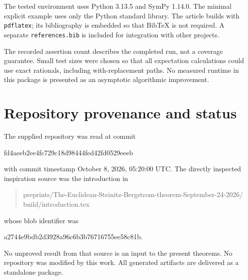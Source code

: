 \documentclass[11pt,letterpaper]{article}
\numberwithin{equation}{section}
\theoremstyle{definition}
\begin{document}
The tested environment uses Python 3.13.5 and SymPy 1.14.0. The minimal explicit example uses only the Python standard library. The article builds with \texttt{pdflatex}; its bibliography is embedded so that BibTeX is not required. A separate \texttt{references.bib} is included for integration with other projects.

The recorded assertion count describes the completed run, not a coverage guarantee. Small test sizes were chosen so that all expectation calculations could use exact rationals, including with-replacement paths. No measured runtime in this package is presented as an asymptotic algorithmic improvement.

\section{Repository provenance and status}
\label{app:provenance}

The supplied repository was read at commit
\begin{center}\small\ttfamily
fd4aeeb2ee4fc729c18d98444fed42fd0529eeeb
\end{center}
with commit timestamp October 8, 2026, 05:20:00 UTC. The directly inspected inspiration source was the introduction in
\begin{quote}\small\ttfamily
preprints/The-Euclidean-Steinitz-Bergstrom-theorem-September-24-2026/\\
build/introduction.tex
\end{quote}
whose blob identifier was
\begin{center}\small\ttfamily
a2744e9bdb2d3928a96c6b3b76716755ee58c81b.
\end{center}
No unproved result from that source is an input to the present theorems. No repository was modified by this work. All generated artifacts are delivered as a standalone package.
\end{document}
